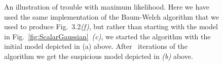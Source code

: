 \begin{figure}[htbp]
  \caption[An illustration of trouble with
  maximum likelihood.]%
  {An illustration of trouble with maximum likelihood.  Here we have
    used the same implementation of the Baum-Welch algorithm that we
    used to produce Fig.~3.2\emph{(f)}, but rather than starting with
    the model in Fig.~\ref{fig:ScalarGaussian}~\emph{(c)}, we started
    the algorithm with the initial model depicted in (a) above.  After
    \MLEfailIterations~iterations of the algorithm we get the
    suspicious model depicted in \emph{(b)} above.}
  \label{fig:MLEfail}
\end{figure}

